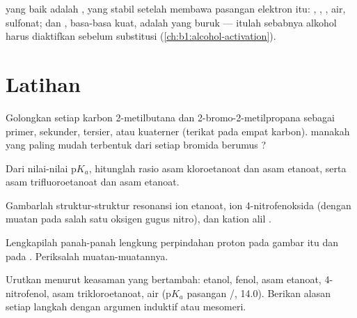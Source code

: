  yang baik adalah , yang stabil setelah membawa
pasangan elektron itu: , , , air, sulfonat;
 dan , basa-basa kuat, adalah  yang buruk ---
itulah sebabnya alkohol harus diaktifkan sebelum substitusi
(\cref{ch:b1:alcohol-activation}).

\section{Latihan}

\begin{exercise}[$\star$]\label{exo:b1:electronic-effects:1}
Golongkan setiap karbon 2-metilbutana dan 2-bromo-2-metilpropana sebagai
primer, sekunder, tersier, atau kuaterner (terikat pada empat karbon).
 manakah yang paling mudah terbentuk dari setiap bromida
berumus ?
\end{exercise}

\begin{exercise}[$\star$]\label{exo:b1:electronic-effects:2}
Dari nilai-nilai $\mathrm{p}K_a$, hitunglah rasio  asam
kloroetanoat dan asam etanoat, serta asam trifluoroetanoat dan asam
etanoat.
\end{exercise}

\begin{exercise}[$\star$]\label{exo:b1:electronic-effects:3}
Gambarlah struktur-struktur resonansi ion etanoat, ion 4-nitrofenoksida
(dengan muatan pada salah satu oksigen gugus nitro), dan kation alil
.
\end{exercise}

\begin{exercise}[$\star$]\label{exo:b1:electronic-effects:4}
Lengkapilah panah-panah lengkung perpindahan proton pada gambar itu dan
pada . Periksalah muatan-muatannya.
\end{exercise}

\begin{exercise}[$\star\star$]\label{exo:b1:electronic-effects:5}
Urutkan menurut keasaman yang bertambah: etanol, fenol, asam etanoat,
4-nitrofenol, asam trikloroetanoat, air ($\mathrm{p}K_a$ pasangan
/, 14.0). Berikan alasan setiap langkah dengan argumen
induktif atau mesomeri.
\end{exercise}

